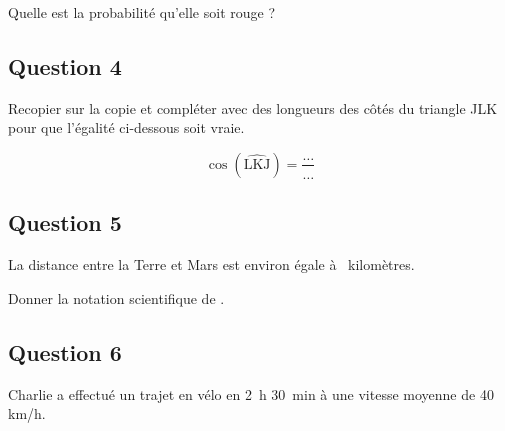 \documentclass[12pt,a4paper,french]{article}
\begin{document}
Quelle est la probabilité qu'elle soit rouge ?

\medskip

\begin{minipage}{0.63\linewidth}
\subsection*{Question 4}
Recopier sur la copie et compléter avec des longueurs des côtés du triangle JLK pour que l'égalité ci-dessous soit vraie.

\[\cos\left(\widehat{\mathrm{LKJ}}\right) = \dfrac{\dots}{\dots}\]
\end{minipage}\hfill

\subsection*{Question 5}

La distance entre la Terre et Mars est environ égale à ~kilomètres.

Donner la notation scientifique de .

\subsection*{Question 6}

Charlie a effectué un trajet en vélo en 2~h 30~min à une vitesse moyenne de 40 km/h.
\end{document}
